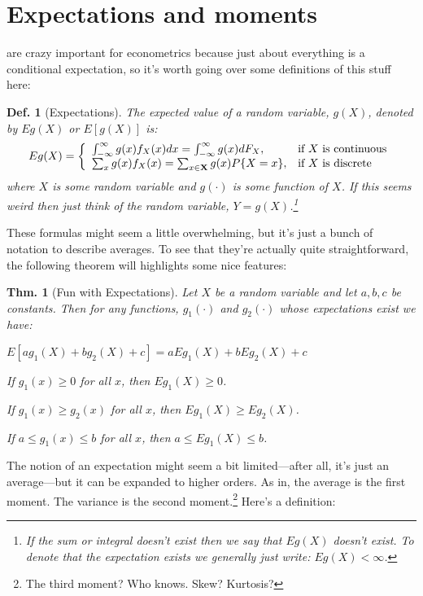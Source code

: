 \documentclass{tufte-book}
\theoremstyle{mytheoremstyle}
\newtheorem*{thm}{Thm.}
\theoremstyle{mylemstyle}
\theoremstyle{mydefstyle}
\newtheorem*{mydef}{Def.}
\begin{document}
\section{Expectations and moments}
 are crazy important for econometrics because just about everything is a conditional expectation, so it's worth going over some definitions of this stuff here:
\begin{mydef}[Expectations] The expected value of a random variable, \(g(X)\), denoted by \(Eg(X)\) or \(E[g(X)]\) is:
	\[Eg(X) = \left\{ 
			  \begin{array}{l l}
			    \int_{-\infty}^\infty g(x)f_{X}(x)dx = \int_{-\infty}^\infty g(x) dF_{X}, & \text{if \(X\) is continuous} \\
			    \sum_{x} g(x)f_{X}(x) = \sum_{x \in \mathbf{X}} g(x)P\{X = x\}, & \text{if \(X\) is discrete}\\
			  \end{array} \right.
	\]
where \(X\) is some random variable and \(g(\cdot)\) is some function of \(X\). If this seems weird then just think of the random variable, \(Y = g(X)\).\footnote{If the sum or integral doesn't exist then we say that \(Eg(X)\) doesn't exist. To denote that the expectation exists we generally just write: \(Eg(X) < \infty\).} 
\end{mydef}
These formulas might seem a little overwhelming, but it's just a bunch of notation to describe averages. To see that they're actually quite straightforward, the following theorem will highlights some nice features:
\begin{thm}[Fun with Expectations] Let \(X\) be a random variable and let \(a, b, c\) be constants. Then for any functions, \(g_1(\cdot)\) and \(g_2(\cdot)\) whose expectations exist we have:
	\begin{description}
		\item \(E[ag_1(X) + bg_2(X) + c] = aEg_1(X) + bEg_2(X) + c\)
		\item If \(g_1(x) \ge 0\) for all \(x\), then \(Eg_1(X) \ge 0\).
		\item If \(g_1(x) \ge g_2(x)\) for all \(x\), then \(Eg_1(X) \ge Eg_2(X)\). 
		\item If \(a \le g_1(x) \le b\) for all \(x\), then \(a \le Eg_1(X) \le b\).
	\end{description}
\end{thm}
\noindent The notion of an expectation might seem a bit limited---after all, it's just an average---but it can be expanded to higher orders. As in, the average is the first moment. The variance is the second moment.\footnote{The third moment? Who knows. Skew? Kurtosis?} Here's a definition:
\end{document}
